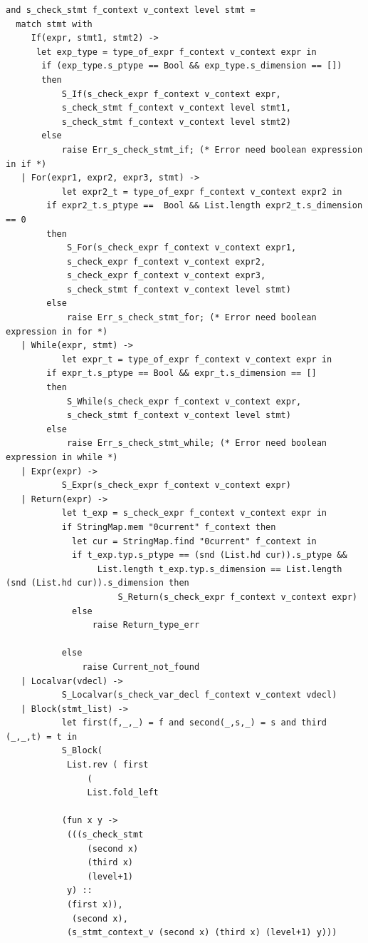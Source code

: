 \documentclass[a4paper,12pt]{article}
\begin{document}
\begin{lstlisting}
and s_check_stmt f_context v_context level stmt =
  match stmt with
     If(expr, stmt1, stmt2) -> 
      let exp_type = type_of_expr f_context v_context expr in
       if (exp_type.s_ptype == Bool && exp_type.s_dimension == [])
       then
           S_If(s_check_expr f_context v_context expr, 
           s_check_stmt f_context v_context level stmt1, 
           s_check_stmt f_context v_context level stmt2) 
       else
           raise Err_s_check_stmt_if; (* Error need boolean expression in if *)
   | For(expr1, expr2, expr3, stmt) ->
           let expr2_t = type_of_expr f_context v_context expr2 in
        if expr2_t.s_ptype ==  Bool && List.length expr2_t.s_dimension == 0
        then
            S_For(s_check_expr f_context v_context expr1, 
            s_check_expr f_context v_context expr2, 
            s_check_expr f_context v_context expr3, 
            s_check_stmt f_context v_context level stmt)
        else
            raise Err_s_check_stmt_for; (* Error need boolean expression in for *)
   | While(expr, stmt) ->
           let expr_t = type_of_expr f_context v_context expr in
        if expr_t.s_ptype == Bool && expr_t.s_dimension == []
        then 
            S_While(s_check_expr f_context v_context expr, 
            s_check_stmt f_context v_context level stmt)
        else
            raise Err_s_check_stmt_while; (* Error need boolean expression in while *)
   | Expr(expr) -> 
           S_Expr(s_check_expr f_context v_context expr) 
   | Return(expr) ->  
           let t_exp = s_check_expr f_context v_context expr in
           if StringMap.mem "0current" f_context then
             let cur = StringMap.find "0current" f_context in
             if t_exp.typ.s_ptype == (snd (List.hd cur)).s_ptype && 
                  List.length t_exp.typ.s_dimension == List.length (snd (List.hd cur)).s_dimension then
                      S_Return(s_check_expr f_context v_context expr)
             else
                 raise Return_type_err

           else
               raise Current_not_found 
   | Localvar(vdecl) -> 
           S_Localvar(s_check_var_decl f_context v_context vdecl)
   | Block(stmt_list) ->
           let first(f,_,_) = f and second(_,s,_) = s and third (_,_,t) = t in
           S_Block(
            List.rev ( first
            	(
            	List.fold_left  
           
           (fun x y ->
           	(((s_check_stmt
           		(second x)
           		(third x)
                (level+1)
           	y) :: 
           	(first x)),
           	 (second x),
           	(s_stmt_context_v (second x) (third x) (level+1) y)))


\end{lstlisting}
\end{document}
